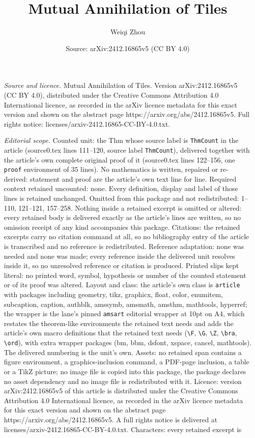\documentclass[10pt,a4paper]{amsart}
\title[Mutual Annihilation of Tiles]{Mutual Annihilation of Tiles}
\author{Weiqi Zhou}
\date{Source: arXiv:2412.16865v5 (CC BY 4.0)}
\begin{document}
\maketitle

\noindent\emph{Source and licence.} Mutual Annihilation of Tiles. Version arXiv:2412.16865v5 (CC BY 4.0), distributed under the Creative Commons Attribution 4.0 International licence, as recorded in the arXiv licence metadata for this exact version and shown on the abstract page https://arxiv.org/abs/2412.16865v5. Full rights notice: licenses/arxiv-2412.16865-CC-BY-4.0.txt.\par\smallskip

\noindent\textit{Editorial scope.} Counted unit: the Thm whose source label is \texttt{ThmCount} in the article (source0.tex lines 111--120, source label \texttt{ThmCount}), delivered together with the article's own complete original proof of it (source0.tex lines 122--156, one \texttt{proof} environment of 35 lines). No mathematics is written, repaired or re-derived: statement and proof are the article's own text line for line. Required context retained uncounted: none. Every definition, display and label of those lines is retained unchanged. Omitted from this package and not redistributed: 1--110, 121--121, 157--258. Nothing inside a retained excerpt is omitted or altered: every retained body is delivered exactly as the article's lines are written, so no omission receipt of any kind accompanies this package. Citations: the retained excerpts carry no citation command at all, so no bibliography entry of the article is transcribed and no reference is redistributed. Reference adaptation: none was needed and none was made; every reference inside the delivered unit resolves inside it, so no unresolved reference or citation is produced. Printed slips kept literal: no printed word, symbol, hypothesis or number of the counted statement or of its proof was altered. Layout and class: the article's own class is \texttt{article} with packages including geometry, tikz, graphicx, float, color, enumitem, subcaption, caption, authblk, amssymb, amsmath, amsthm, mathtools, hyperref; the wrapper is the lane's pinned \texttt{amsart} editorial wrapper at 10pt on A4, which restates the theorem-like environments the retained text needs and adds the article's own macro definitions that the retained text needs (\texttt{\textbackslash F}, \texttt{\textbackslash G}, \texttt{\textbackslash Z}, \texttt{\textbackslash bra}, \texttt{\textbackslash ord}), with extra wrapper packages (bm, bbm, dsfont, xspace, cancel, mathtools). The delivered numbering is the unit's own. Assets: no retained span contains a figure environment, a graphics-inclusion command, a PDF-page inclusion, a table or a TikZ picture; no image file is copied into this package, the package declares no asset dependency and no image file is redistributed with it. Licence: version arXiv:2412.16865v5 of this article is distributed under the Creative Commons Attribution 4.0 International licence, as recorded in the arXiv licence metadata for this exact version and shown on the abstract page https://arxiv.org/abs/2412.16865v5. A full rights notice is delivered at licenses/arxiv-2412.16865-CC-BY-4.0.txt. Characters: every retained excerpt is 
\end{document}
